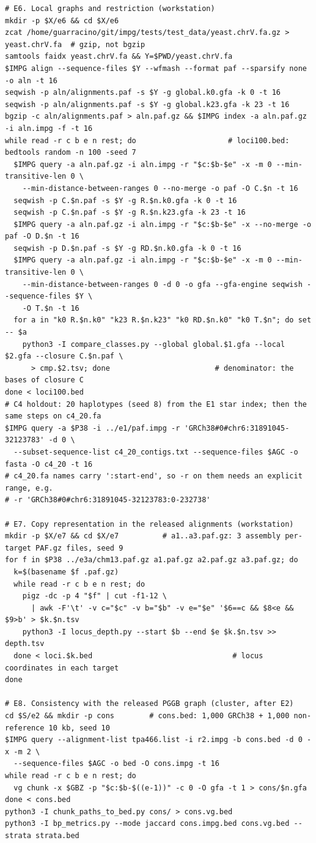 {\begin{verbatim}
# E6. Local graphs and restriction (workstation)
mkdir -p $X/e6 && cd $X/e6
zcat /home/guarracino/git/impg/tests/test_data/yeast.chrV.fa.gz > yeast.chrV.fa  # gzip, not bgzip
samtools faidx yeast.chrV.fa && Y=$PWD/yeast.chrV.fa
$IMPG align --sequence-files $Y --wfmash --format paf --sparsify none -o aln -t 16
seqwish -p aln/alignments.paf -s $Y -g global.k0.gfa -k 0 -t 16
seqwish -p aln/alignments.paf -s $Y -g global.k23.gfa -k 23 -t 16
bgzip -c aln/alignments.paf > aln.paf.gz && $IMPG index -a aln.paf.gz -i aln.impg -f -t 16
while read -r c b e n rest; do                     # loci100.bed: bedtools random -n 100 -seed 7
  $IMPG query -a aln.paf.gz -i aln.impg -r "$c:$b-$e" -x -m 0 --min-transitive-len 0 \
    --min-distance-between-ranges 0 --no-merge -o paf -O C.$n -t 16
  seqwish -p C.$n.paf -s $Y -g R.$n.k0.gfa -k 0 -t 16
  seqwish -p C.$n.paf -s $Y -g R.$n.k23.gfa -k 23 -t 16
  $IMPG query -a aln.paf.gz -i aln.impg -r "$c:$b-$e" -x --no-merge -o paf -O D.$n -t 16
  seqwish -p D.$n.paf -s $Y -g RD.$n.k0.gfa -k 0 -t 16
  $IMPG query -a aln.paf.gz -i aln.impg -r "$c:$b-$e" -x -m 0 --min-transitive-len 0 \
    --min-distance-between-ranges 0 -d 0 -o gfa --gfa-engine seqwish --sequence-files $Y \
    -O T.$n -t 16
  for a in "k0 R.$n.k0" "k23 R.$n.k23" "k0 RD.$n.k0" "k0 T.$n"; do set -- $a
    python3 -I compare_classes.py --global global.$1.gfa --local $2.gfa --closure C.$n.paf \
      > cmp.$2.tsv; done                        # denominator: the bases of closure C
done < loci100.bed
# C4 holdout: 20 haplotypes (seed 8) from the E1 star index; then the same steps on c4_20.fa
$IMPG query -a $P38 -i ../e1/paf.impg -r 'GRCh38#0#chr6:31891045-32123783' -d 0 \
  --subset-sequence-list c4_20_contigs.txt --sequence-files $AGC -o fasta -O c4_20 -t 16
# c4_20.fa names carry ':start-end', so -r on them needs an explicit range, e.g.
# -r 'GRCh38#0#chr6:31891045-32123783:0-232738'

# E7. Copy representation in the released alignments (workstation)
mkdir -p $X/e7 && cd $X/e7          # a1..a3.paf.gz: 3 assembly per-target PAF.gz files, seed 9
for f in $P38 ../e3a/chm13.paf.gz a1.paf.gz a2.paf.gz a3.paf.gz; do
  k=$(basename $f .paf.gz)
  while read -r c b e n rest; do
    pigz -dc -p 4 "$f" | cut -f1-12 \
      | awk -F'\t' -v c="$c" -v b="$b" -v e="$e" '$6==c && $8<e && $9>b' > $k.$n.tsv
    python3 -I locus_depth.py --start $b --end $e $k.$n.tsv >> depth.tsv
  done < loci.$k.bed                                # locus coordinates in each target
done

# E8. Consistency with the released PGGB graph (cluster, after E2)
cd $S/e2 && mkdir -p cons        # cons.bed: 1,000 GRCh38 + 1,000 non-reference 10 kb, seed 10
$IMPG query --alignment-list tpa466.list -i r2.impg -b cons.bed -d 0 -x -m 2 \
  --sequence-files $AGC -o bed -O cons.impg -t 16
while read -r c b e n rest; do
  vg chunk -x $GBZ -p "$c:$b-$((e-1))" -c 0 -O gfa -t 1 > cons/$n.gfa
done < cons.bed
python3 -I chunk_paths_to_bed.py cons/ > cons.vg.bed
python3 -I bp_metrics.py --mode jaccard cons.impg.bed cons.vg.bed --strata strata.bed


\end{verbatim}}
